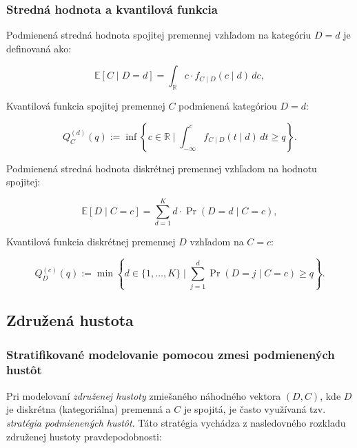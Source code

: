 \subsubsection{Stredná hodnota a kvantilová funkcia}

Podmienená stredná hodnota spojitej premennej vzhľadom na kategóriu $D = d$ je definovaná ako:

\begin{equation}
\mathbb{E}[C \mid D = d] = \int_{\mathbb{R}} c \cdot f_{C \mid D}(c \mid d) \, dc,
\end{equation}

Kvantilová funkcia spojitej premennej $C$ podmienená kategóriou $D = d$:

\begin{equation}
Q_C^{(d)}(q) := \inf \left\{ c \in \mathbb{R} \mid \int_{-\infty}^c f_{C \mid D}(t \mid d) \, dt \geq q \right\}.
\end{equation}

Podmienená stredná hodnota diskrétnej premennej vzhľadom na hodnotu spojitej:

\begin{equation}
\mathbb{E}[D \mid C = c] = \sum_{d=1}^{K} d \cdot \Pr(D = d \mid C = c),
\end{equation}

Kvantilová funkcia diskrétnej premennej $D$ vzhľadom na $C = c$:

\begin{equation}
Q_D^{(c)}(q) := \min \left\{ d \in \{1, \ldots, K\} \mid \sum_{j=1}^{d} \Pr(D = j \mid C = c) \geq q \right\}.
\end{equation}



\subsection{Združená hustota}
\label{subsec:conditional_mixture_strategy}

\subsubsection{Stratifikované modelovanie pomocou zmesi podmienených hustôt}\label{subsubsec:stratif_joint_density}

Pri modelovaní \textit{združenej hustoty} zmiešaného náhodného vektora $(D, C)$, kde $D$ je diskrétna (kategoriálna) premenná a $C$ je spojitá, je často využívaná tzv. \textit{stratégia podmienených hustôt}. Táto stratégia vychádza z nasledovného rozkladu združenej hustoty pravdepodobnosti:


